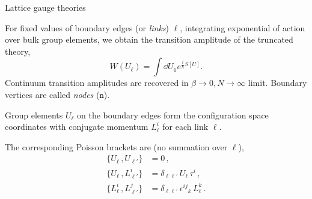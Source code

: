 \documentclass[12pt,titlepage]{article}
\begin{document}
\begin{frame}{Lattice gauge theories}
    \begin{list}{\,}{\leftmargin=1em \itemindent=0em}
        \item<1-> For fixed values of boundary edges (or \textit{links}) $\ell$, integrating exponential of action over bulk group elements, we obtain the transition amplitude of the truncated theory,
        \begin{equation}
            W(U_\ell)=\int\dd{U_\mathtt{e}}e^{\frac{i}{\hbar}S[U]}.
        \end{equation}
        Continuum transition amplitudes are recovered in $\beta\to 0,N\to\infty$ limit. Boundary vertices are called \textit{nodes} ($\mathtt{n}$).
        \item<2-> Group elements $U_\ell$ on the boundary edges form the configuration space coordinates with conjugate momentum $L^i_\ell$ for each link $\ell$.
        \item<3-> The corresponding Poisson brackets are (no summation over $\ell$),
        \begin{align}
            \{U_\ell\,,U_{\ell'}\}&=0\,,\\
            \{U_{\ell}\,,L^i_{\ell'}\}&=\delta_{\ell\ell'}\,U_\ell\,\tau^i\,,\\
            \{L^i_{\ell}\,,L^j_{\ell'}\}&=\delta_{\ell\ell'}\,{\epsilon^{ij}}_k\, L^k_{\ell}\,.
        \end{align}
    \end{list}
\end{frame}
\end{document}
